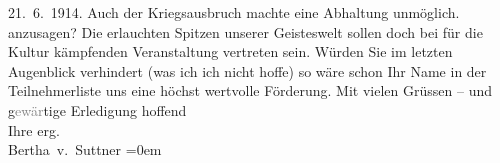 \begin{ledgroupsized}[t]{13cm}
{{{                            21. 6. 1914. Auch der Kriegsausbruch machte eine Abhaltung
                        unmöglich.}}}\label{K_L02179_1h} anzusagen? Die erlauchten Spitzen unserer Geisteswelt
                    sollen doch bei für die Kultur kämpfenden Veranstaltung
                    vertreten sein.\pend
           \pstart
           Würden Sie im letzten Augenblick verhindert (was ich ich nicht hoffe) so wäre
                    schon Ihr Name in der Teilnehmerliste uns eine höchst wertvolle Förderung.\pend
           \pstart
           Mit vielen Grüssen – und g\textcolor{gray}{ewär}tige Erledigung
                    hoffend{\\[\baselineskip]}Ihre erg.{\\[\baselineskip]}\spacefill\mbox{Bertha v. Suttner}\pend
           \leftskip=0em{}\endnumbering{}\end{ledgroupsized}  \newcommand{\dateiname}{L02179}\newcommand{\titel}{Bertha von Suttner an Arthur und Olga Schnitzler, 14. 5. 1914}\newcommand{\editorInnen}{Martin Anton Müller und Gerd-Hermann Susen}
      